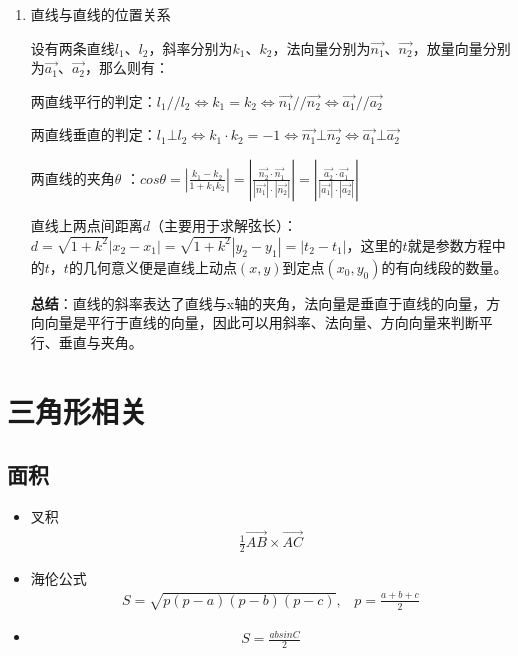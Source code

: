 \begin{enumerate}
\item 直线与直线的位置关系\par
设有两条直线$l_1$、$l_2$，斜率分别为$k_1$、$k_2$，法向量分别为$\overrightarrow{n_1}$、$\overrightarrow{n_2}$，放量向量分别为$\overrightarrow{a_1}$、$\overrightarrow{a_2}$，那么则有：\par
两直线平行的判定：$l_1//l_2\Leftrightarrow k_1=k_2\Leftrightarrow \overrightarrow{n_1}//\overrightarrow{n_2}\Leftrightarrow \overrightarrow{a_1}//\overrightarrow{a_2}$\par
两直线垂直的判定：$l_1\bot l_2\Leftrightarrow k_1\cdot k_2=-1\Leftrightarrow \overrightarrow{n_1}\bot \overrightarrow{n_2}\Leftrightarrow \overrightarrow{a_1}\bot \overrightarrow{a_2}$\par
两直线的夹角$\theta$ ：$cos\theta =|\frac{k_1-k_2}{1+k_1k_2}| =|\frac{\overrightarrow{n_2}\cdot \overrightarrow{n_1}}{|\overrightarrow{n_1}|\cdot |\overrightarrow{n_2}|}| =|\frac{\overrightarrow{a_2}\cdot \overrightarrow{a_1}}{|\overrightarrow{a_1}|\cdot |\overrightarrow{a_2}|}| $\par
直线上两点间距离$d$（主要用于求解弦长）：$d=\sqrt{1+k^2} |x_2-x_1|=\sqrt{1+k^2} |y_2-y_1|= |t_2-t_1|$，这里的$t$就是参数方程中的$t$，$t$的几何意义便是直线上动点$(x,y)$到定点$(x_0,y_0)$的有向线段的数量。\par

\textbf{总结}：直线的斜率表达了直线与x轴的夹角，法向量是垂直于直线的向量，方向向量是平行于直线的向量，因此可以用斜率、法向量、方向向量来判断平行、垂直与夹角。\par


\end{enumerate}


\section{三角形相关}

\subsection{面积}

\begin{itemize}
\item 叉积
\begin{eqnarray*}
\frac{1}{2} \overrightarrow{AB} \times \overrightarrow{AC}
\end{eqnarray*} 

\item 海伦公式
\begin{eqnarray*}
S = \sqrt{p(p-a)(p-b)(p-c)},\;\;\;p=\frac{a+b+c}{2}
\end{eqnarray*} 

\item 
\begin{eqnarray*}
S = \frac{absinC}{2}
\end{eqnarray*}
\end{itemize}

